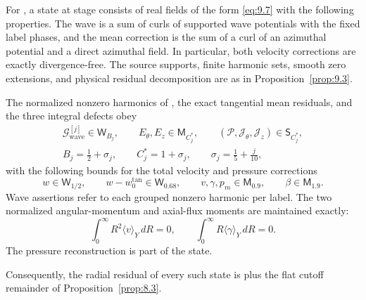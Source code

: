 \begin{definition}\label{def:9.4}
For , a state at stage
 consists of real fields of the form \eqref{eq:9.7} with the following
properties. The wave  is a sum of curls of supported wave potentials with the
fixed label phases, and the mean correction  is the sum of a
curl of an azimuthal potential and a direct azimuthal field. In particular, both velocity corrections
are exactly divergence-free. The source supports, finite harmonic sets, smooth zero extensions, and
physical residual decomposition are as in Proposition~\ref{prop:9.3}.

The normalized nonzero harmonics  of
, the exact tangential mean residuals, and the three integral
defects obey
\begin{equation}
\begin{gathered}
\mathcal G_{\mathrm{wave}}^{[j]}\in \mathsf W_{B_j},
\qquad E_\theta,E_z\in \mathsf M_{C_j^*},
\qquad (\mathcal P,\mathcal J_\theta,\mathcal J_z)\in \mathsf S_{C_j^*},\\
B_j=\frac12+\sigma_j,
\qquad C_j^*=1+\sigma_j,
\qquad \sigma_j=\frac15+\frac{j}{10},
\end{gathered}
\tag{9.8}\label{eq:9.8}
\end{equation}
with the following bounds for the total velocity and pressure corrections
\begin{equation}
w\in \mathsf W_{1/2},
\qquad w-w_0^{\mathrm{tan}}\in \mathsf W_{0.68},
\qquad v,\gamma,p_m\in \mathsf M_{0.9},
\qquad \beta\in \mathsf M_{1.9}.
\tag{9.9}\label{eq:9.9}
\end{equation}
Wave assertions refer to each grouped nonzero harmonic per label. The two normalized
angular-momentum and axial-flux moments are maintained exactly:
\begin{equation}
\int_0^\infty R^2\langle v\rangle_Y\,dR=0,
\qquad
\int_0^\infty R\langle\gamma\rangle_Y\,dR=0.
\tag{9.10}\label{eq:9.10}
\end{equation}
The pressure reconstruction is part of the state.

Consequently, the radial residual of every such state is
 plus the flat cutoff remainder of
Proposition~\ref{prop:8.3}.
\end{definition}

